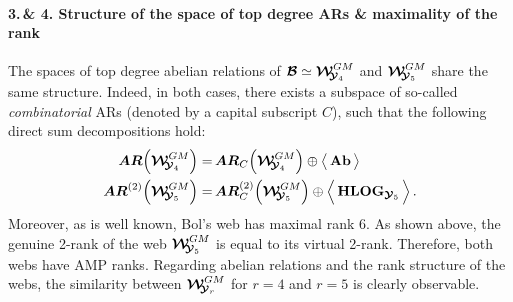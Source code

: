 \documentclass[11pt]{amsart}
\newcommand{\sk}{\smallskip}
\begin{document}
\paragraph{\bf 3.\,\& 4. Structure of the space of top degree ARs \& maximality of the rank}%
The spaces of top degree abelian relations of $\boldsymbol{\mathcal B}\simeq 
\boldsymbol{\mathcal W}_{\hspace{-0.1cm} \boldsymbol{\mathcal Y}_4}^{GM}$ 
and $\boldsymbol{\mathcal W}_{\hspace{-0.1cm} \boldsymbol{\mathcal Y}_5}^{GM}$ share the same structure. Indeed, in both cases, there exists a subspace of so-called \emph{combinatorial} ARs (denoted by a capital subscript ${C}$), such that the following direct sum decompositions hold:
\begin{align}%
\label{Eq:Decomp-Direct-Sums}
\boldsymbol{AR}
\Big( \boldsymbol{\mathcal W}_{\hspace{-0.1cm} \boldsymbol{\mathcal Y}_4}^{GM} \Big) = &\, 
\boldsymbol{AR}_C
\Big( \boldsymbol{\mathcal W}_{\hspace{-0.1cm} \boldsymbol{\mathcal Y}_4}^{GM} \Big)\oplus 
\big\langle \,
{\bf Ab} \,
\big\rangle  
\\ 
\boldsymbol{AR}^{(2)}
\Big( \boldsymbol{\mathcal W}_{\hspace{-0.1cm} \boldsymbol{\mathcal Y}_5}^{GM} \Big) = &\, 
\boldsymbol{AR}_C^{(2)}
\Big( \boldsymbol{\mathcal W}_{\hspace{-0.1cm} \boldsymbol{\mathcal Y}_5}^{GM} \Big)\oplus 
\Big\langle \, 
{\bf HLOG}_{\boldsymbol{\mathcal Y}_5}\,
\Big\rangle  \, . 
\nonumber
%
\end{align}%
Moreover, as is well known, Bol's web has maximal rank 6. As shown above, the genuine 2-rank of the web $ \boldsymbol{\mathcal W}_{\hspace{-0.1cm} \boldsymbol{\mathcal Y}_5}^{GM} $ is equal to its virtual 2-rank. Therefore, both webs have AMP ranks. 
Regarding abelian relations and the rank structure of the webs, the similarity between $ \boldsymbol{\mathcal W}_{\hspace{-0.1cm} \boldsymbol{\mathcal Y}_r}^{GM}$  for $r = 4$ and $r = 5$ is clearly observable.
\sk 
\end{document}
